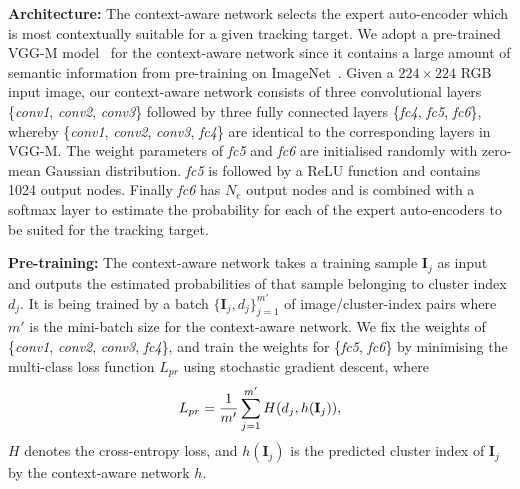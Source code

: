 \documentclass[10pt,twocolumn,letterpaper]{article}
\begin{document}
\textbf{Architecture:}
The context-aware network selects the expert auto-encoder which is most contextually suitable for a given tracking target.
We adopt a pre-trained VGG-M model~\cite{ref:vggm} for the context-aware network since it contains a large amount of semantic information from pre-training on ImageNet~\cite{ref:ImageNet}. 
Given a $224\times 224$ RGB input image, our context-aware network consists of three convolutional layers \{\textit{conv1}, \textit{conv2}, \textit{conv3}\} followed by three fully connected layers \{\textit{fc4}, \textit{fc5}, \textit{fc6}\}, whereby \{\textit{conv1}, \textit{conv2}, \textit{conv3}, \textit{fc4}\} are identical to the corresponding layers in VGG-M. 
The weight parameters of \textit{fc5} and \textit{fc6} are initialised randomly with zero-mean Gaussian distribution. 
\textit{fc5} is followed by a ReLU function and contains 1024 output nodes. 
Finally \textit{fc6} has $N_e$ output nodes and is combined with a softmax layer to estimate the probability for each of the expert auto-encoders to be suited for the tracking target.


\textbf{Pre-training:}
The context-aware network takes a training sample $\mathbf{I}_j$ as input and outputs the estimated probabilities of that sample belonging to cluster index $d_j$.
It is being trained by a batch $\{ \mathbf{I}_j, d_j \}_{j=1}^{m'}$ of image/cluster-index pairs where $m'$ is the mini-batch size for the context-aware network.
We fix the weights of \{\textit{conv1}, \textit{conv2}, \textit{conv3}, \textit{fc4}\}, and train the weights for \{\textit{fc5}, \textit{fc6}\} by minimising the multi-class loss function $L_{pr}$ using stochastic gradient descent, where
\small
\vspace{-2mm}
\begin{equation}
L_{pr} = \frac{1}{m'} \sum_{j=1}^{m'} H(d_j, h(\mathbf{I}_j)),
\vspace{-2mm}
\end{equation}
\normalsize
$H$ denotes the cross-entropy loss, and $h(\mathbf{I}_j)$ is the predicted cluster index of $\mathbf{I}_j$ by the context-aware network $h$.
\end{document}

